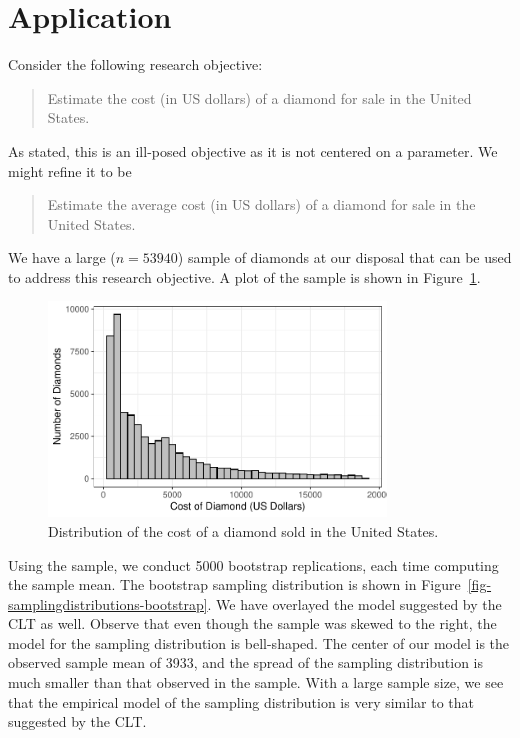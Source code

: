 \documentclass[
  letterpaper,
  DIV=11,
  numbers=noendperiod]{scrreprt}
\theoremstyle{plain}
\theoremstyle{definition}
\theoremstyle{definition}
\theoremstyle{remark}
\begin{document}
\hypertarget{application}{%
\section{Application}\label{application}}

Consider the following research objective:

\begin{quote}
Estimate the cost (in US dollars) of a diamond for sale in the United
States.
\end{quote}

As stated, this is an ill-posed objective as it is not centered on a
parameter. We might refine it to be

\begin{quote}
Estimate the average cost (in US dollars) of a diamond for sale in the
United States.
\end{quote}

We have a large (\(n = 53940\)) sample of diamonds at our disposal that
can be used to address this research objective. A plot of the sample is
shown in Figure~\ref{fig-samplingdistributions-sample}.

\begin{figure}

{\centering \includegraphics[width=0.8\textwidth,height=\textheight]{./images/fig-samplingdistributions-sample-1.pdf}

}

\caption{\label{fig-samplingdistributions-sample}Distribution of the
cost of a diamond sold in the United States.}

\end{figure}

Using the sample, we conduct 5000 bootstrap replications, each time
computing the sample mean. The bootstrap sampling distribution is shown
in Figure~\ref{fig-samplingdistributions-bootstrap}. We have overlayed
the model suggested by the CLT as well. Observe that even though the
sample was skewed to the right, the model for the sampling distribution
is bell-shaped. The center of our model is the observed sample mean of
3933, and the spread of the sampling distribution is much smaller than
that observed in the sample. With a large sample size, we see that the
empirical model of the sampling distribution is very similar to that
suggested by the CLT.
\end{document}
